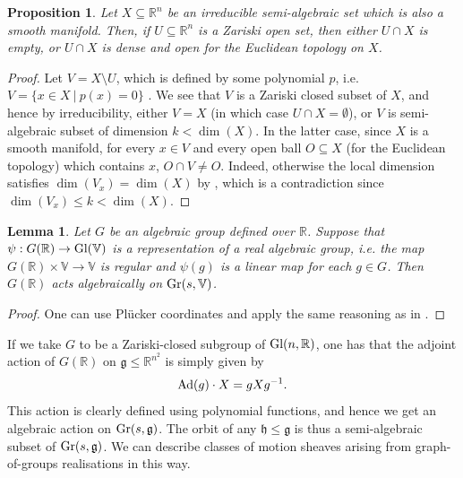 \documentclass{article}
\newtheorem{proposition}[theorem]{Proposition}
\newtheorem{lemma}[theorem]{Lemma}
\theoremstyle{definition}
\theoremstyle{remark}
\begin{document}
\begin{proposition}\label{dense-Euclidean}
    Let $X \subseteq \mathbb{R}^{n}$ be an irreducible semi-algebraic set which is also a smooth manifold. Then, if $U\subseteq \mathbb{R}^{n}$ is a Zariski open set, then either $U\cap X$ is empty, or $U\cap X$ is dense and open for the Euclidean topology on $X$.  
\end{proposition}
\begin{proof}
Let $V=X\setminus U$, which is defined by some polynomial $p$, i.e. $V = \{ x\in X ~\vert~p(x) = 0\}$ \cite[Proposition 2.1.3.]{Bochnak1998}. We see that $V$ is a Zariski closed subset of $X$, and hence by irreducibility, either $V=X$ (in which case $U\cap X= \emptyset$), or $V$ is semi-algebraic subset of dimension $ k < \dim(X)$. In the latter case, since $X$ is a smooth manifold, for every $x\in V$ and every open ball $O\subseteq X$ (for the Euclidean topology) which contains $x$, $O\cap V\neq O$. Indeed, otherwise the local dimension satisfies $\dim(V_x) = \dim(X)$ by \cite[Proposition 2.8.14]{Bochnak1998}, which is a contradiction since $\dim(V_x)\leq k < \dim(X)$.
\end{proof}


\begin{lemma}\label{lem: action-V-action-gr(k,V)}
    Let $G$ be an algebraic group defined over $\mathbb{R}$. Suppose that $\psi: G(\mathbb{R})\rightarrow \textup{Gl}(\mathbb{V})$ is a representation of a real algebraic group, i.e. the map $G(\mathbb{R})\times \mathbb{V} \rightarrow \mathbb{V}$ is regular and $\psi(g)$ is a linear map for each $g\in G$. Then $G(\mathbb{R})$ acts algebraically on $\textup{Gr}(s, \mathbb{V})$.
\end{lemma}
\begin{proof}
One can use Plücker coordinates and apply the same reasoning as in \cite[Theorem 10.19]{harris2013algebraic}.
\end{proof}

If we take $G$ to be a Zariski-closed subgroup of $\textup{Gl}(n, \mathbb{R})$, one has that the adjoint action of $G(\mathbb{R})$ on $\mathfrak{g} \leq \mathbb{R}^{n^2}$ is simply given by
\begin{equation*}
    \textup{Ad}(g)\cdot X =g X g^{-1}.
\end{equation*}
This action is clearly defined using polynomial functions, and hence we get an algebraic action on $\textup{Gr}(s, \mathfrak{g})$. The orbit of any $\mathfrak{h} \leq \mathfrak{g}$ is thus a semi-algebraic subset of 
$\textup{Gr}(s, \mathfrak{g})$. We can describe classes of motion sheaves arising from graph-of-groups realisations in this way.
\end{document}
